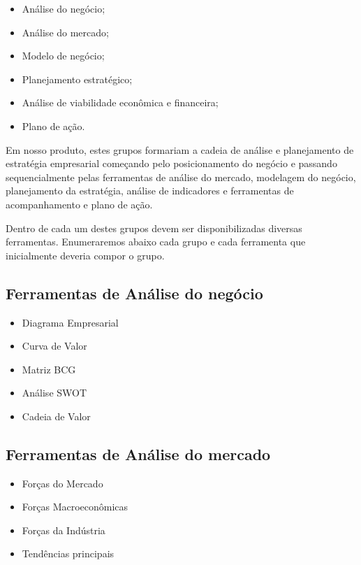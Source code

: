 \documentclass{abnt}
\begin{document}
\begin{itemize}
	\item Análise do negócio;
	\item Análise do mercado;
	\item Modelo de negócio;
	\item Planejamento estratégico;
	\item Análise de viabilidade econômica e financeira;
	\item Plano de ação.
\end{itemize}

Em nosso produto, estes grupos formariam a cadeia de análise e planejamento de
estratégia empresarial começando pelo posicionamento do negócio e passando
sequencialmente pelas ferramentas de análise do mercado, modelagem do negócio,
planejamento da estratégia, análise de indicadores e ferramentas de
acompanhamento e plano de ação.

Dentro de cada um destes grupos devem ser disponibilizadas diversas ferramentas.
Enumeraremos abaixo cada grupo e cada ferramenta que inicialmente deveria compor
o grupo.

\subsection{Ferramentas de Análise do negócio}

\begin{itemize}
	\item Diagrama Empresarial \cite{DiagramaEmpresarial}
	\item Curva de Valor \cite{CurvaValor}
	\item Matriz BCG \cite{BCG}
	\item Análise SWOT \cite{SWOT}
	\item Cadeia de Valor \cite{CadeiaDeValor}
\end{itemize}

\subsection{Ferramentas de Análise do mercado}

\begin{itemize}
	\item Forças do Mercado \cite{Porter}
	\item Forças Macroeconômicas \cite{Porter}
	\item Forças da Indústria \cite{Porter}
	\item Tendências principais \cite{Porter}
\end{itemize}
\end{document}
